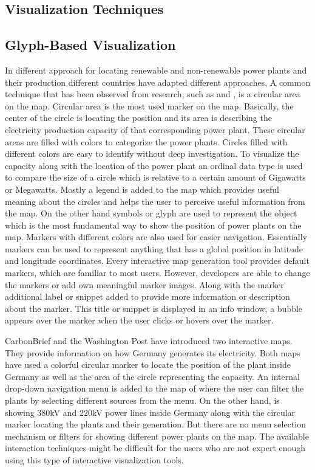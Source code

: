 \subsection{Visualization Techniques}

\subsection*{Glyph-Based Visualization}

In different approach for locating renewable and non-renewable power plants and their production 
different countries have adapted different approaches. A common technique that has been observed from research, such as \cite{cbg2016} and \cite{wp2015}, is a circular area on the map. Circular area is the most used marker on the map. Basically, the center of the circle is locating the position and its area is describing the electricity production capacity of that corresponding power plant. These circular areas are filled with colors to categorize the power plants. Circles filled with different colors are easy to identify without deep investigation. To visualize the capacity along with the location of the power plant an ordinal data type is used to compare the size of a circle which is relative to a certain amount of Gigawatts or Megawatts. Mostly a legend is added to the map which provides useful meaning about the circles and helps the user to perceive useful information from the map. On the other hand symbols or glyph are used to represent the object which is the most fundamental way to show the position of power plants on the map. Markers with different colors are also used for easier navigation. Essentially markers can be used to represent anything that has a global position in latitude and longitude coordinates. Every interactive map generation tool provides default markers, which are familiar to most users. However, developers are able to change the markers or add own meaningful marker images. Along with the marker additional label or snippet added to provide more information or description about the marker. This title or snippet is displayed in an info window, a bubble appears over the marker when the user clicks or hovers over the marker.

CarbonBrief \cite{cbg2016} and the Washington Post \cite{gportal2016} have introduced two interactive maps. They provide information on how Germany generates its electricity. Both maps have used a colorful circular marker to locate the position of the plant inside Germany as well as the area of the circle representing the capacity. An internal drop-down navigation menu is added to the map of \cite{cbg2016} where the user can filter the plants by selecting different sources from the menu. On the other hand, \cite{gportal2016} is showing 380kV and 220kV power lines inside Germany along with the circular marker locating the plants and their generation. But there are no menu selection mechanism or filters for showing different power plants on the map. The available interaction techniques might be difficult for the users who are not expert enough using this type of interactive visualization tools. 

